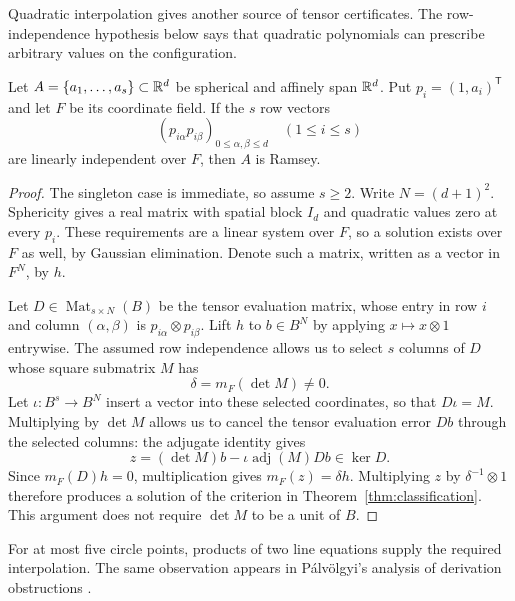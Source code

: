 Quadratic interpolation gives another source of tensor certificates.
The row-independence hypothesis below says that quadratic polynomials
can prescribe arbitrary values on the configuration.

\begin{proposition}\label{cons:quadratic}
Let $A=\{a_1,\ldots,a_s\}\subset\mathbb R^d$ be spherical and affinely
span $\mathbb R^d$. Put $p_i=(1,a_i)^{\mathsf T}$ and let $F$ be its
coordinate field. If the $s$ row vectors
\[
 (p_{i\alpha}p_{i\beta})_{0\le\alpha,\beta\le d}
 \quad(1\le i\le s)
\]
are linearly independent over $F$, then $A$ is Ramsey.
\end{proposition}
\begin{proof}
The singleton case is immediate, so assume $s\ge2$. Write
$N=(d+1)^2$. Sphericity gives a real matrix with spatial block
$I_d$ and quadratic values zero at every $p_i$. These requirements
are a linear system over $F$, so a solution exists over $F$ as well,
by Gaussian elimination. Denote such a matrix, written as a vector in
$F^N$, by $h$.

Let $D\in\operatorname{Mat}_{s\times N}(B)$ be the tensor evaluation
matrix, whose entry in row $i$ and column $(\alpha,\beta)$ is
$p_{i\alpha}\otimes p_{i\beta}$. Lift $h$ to $b\in B^N$ by applying
$x\mapsto x\otimes1$ entrywise. The assumed row independence allows
us to select $s$ columns of $D$ whose square submatrix $M$ has
\[
 \delta=m_F(\det M)\ne0.
\]
Let $\iota:B^s\to B^N$ insert a vector into these selected coordinates,
so that $D\iota=M$. Multiplying by $\det M$ allows us to cancel the
tensor evaluation error $Db$ through the selected columns: the adjugate
identity gives
\[
 z=(\det M)b-\iota\operatorname{adj}(M)Db\in\ker D.
\]
Since $m_F(D)h=0$, multiplication gives $m_F(z)=\delta h$.
Multiplying $z$ by $\delta^{-1}\otimes1$ therefore produces a
solution of the criterion in Theorem~\ref{thm:classification}.
This argument does not require $\det M$ to be a unit of $B$.
\end{proof}

For at most five circle points, products of two line equations supply
the required interpolation. The same observation appears in P\'alv\"olgyi's
analysis of derivation obstructions
\cite[proof of Theorem~A.2]{palvolgyi-heptagon}.

